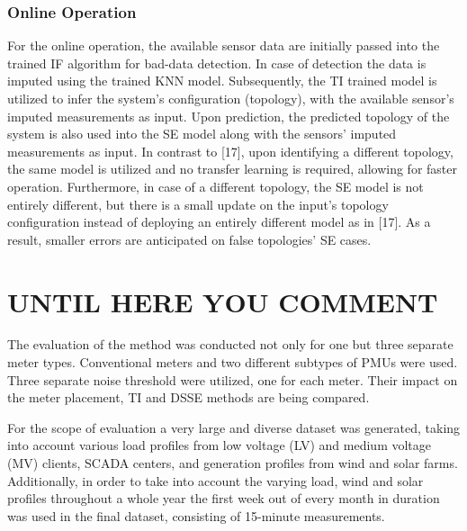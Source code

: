 \documentclass[journal]{IEEEtran}  %
\begin{document}
\subsubsection*{Online Operation}
For the online operation, the available sensor data are initially passed into the trained IF algorithm for bad-data detection. In case of detection the data is imputed using the trained KNN model. Subsequently, the TI trained model is utilized to infer the system's configuration (topology), with the available sensor's imputed measurements as input. Upon prediction, the predicted topology of the system is also used into the SE model along with the sensors' imputed measurements as input. In contrast to [17], upon identifying a different topology, the same model is utilized and no transfer learning is required, allowing for faster operation. Furthermore, in case of a different topology, the SE model is not entirely different, but there is a small update on the input's topology configuration instead of deploying an entirely different model as in [17]. As a result, smaller errors are anticipated on false topologies' SE cases.



































\section{UNTIL HERE YOU COMMENT}

The evaluation of the method was conducted not only for one but three separate meter types. Conventional meters and two different subtypes of PMUs were used. Three separate noise threshold were utilized, one for each meter. Their impact on the meter placement, TI and DSSE methods are being compared.

For the scope of evaluation a very large and diverse dataset was generated, taking into account various load profiles from low voltage (LV) and medium voltage (MV) clients, SCADA centers, and generation profiles from wind and solar farms. Additionally, in order to take into account the varying load, wind and solar profiles throughout a whole year the first week out of every month in duration was used in the final dataset, consisting of 15-minute measurements.
\end{document}
